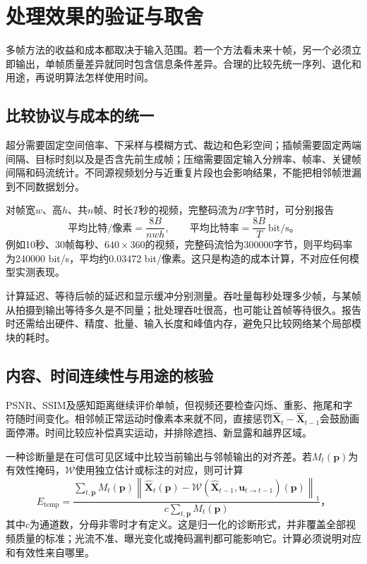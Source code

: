 \section{处理效果的验证与取舍}
\label{sec:vision-video-restoration-evaluation}

多帧方法的收益和成本都取决于输入范围。若一个方法看未来十帧，另一个必须立即输出，单帧质量差异就同时包含信息条件差异。合理的比较先统一序列、退化和用途，再说明算法怎样使用时间。

\subsection{比较协议与成本的统一}
\label{sec:vision-video-restoration-protocol}

超分需要固定空间倍率、下采样与模糊方式、裁边和色彩空间；插帧需要固定两端间隔、目标时刻以及是否含先前生成帧；压缩需要固定输入分辨率、帧率、关键帧间隔和码流统计。不同源视频划分与近重复片段也会影响结果，不能把相邻帧泄漏到不同数据划分。

对帧宽$w$、高$h$、共$n$帧、时长$T$秒的视频，完整码流为$B$字节时，可分别报告
\[
  \text{平均比特/像素}=\frac{8B}{nwh},
  \qquad
  \text{平均比特率}=\frac{8B}{T}\ \mathrm{bit/s}\text{。}
\]
例如10秒、30帧每秒、$640\times360$的视频，完整码流恰为300000字节，则平均码率为240000 bit/s，平均约0.03472 bit/像素。这只是构造的成本计算，不对应任何模型实测表现。

计算延迟、等待后帧的延迟和显示缓冲分别测量。吞吐量每秒处理多少帧，与某帧从拍摄到输出等待多久是不同量；批处理吞吐很高，也可能让首帧等待很久。报告时还需给出硬件、精度、批量、输入长度和峰值内存，避免只比较网络某个局部模块的耗时。

\subsection{内容、时间连续性与用途的核验}
\label{sec:vision-video-temporal-quality}

PSNR、SSIM及感知距离继续评价单帧，但视频还要检查闪烁、重影、拖尾和字符随时间变化。相邻帧正常运动时像素本来就不同，直接惩罚$\widehat{\bm{X}}_t-\widehat{\bm{X}}_{t-1}$会鼓励画面停滞。时间比较应补偿真实运动，并排除遮挡、新显露和越界区域。

一种诊断量是在可信可见区域中比较当前输出与邻帧输出的对齐差。若$M_t(\bm{p})$为有效性掩码，$\mathcal{W}$使用独立估计或标注的对应，则可计算
\begin{equation}
  E_{\mathrm{temp}}=
  \frac{\sum_{t,\bm{p}}M_t(\bm{p})
    \left\lVert\widehat{\bm{X}}_t(\bm{p})
      -\mathcal{W}(\widehat{\bm{X}}_{t-1},
        \bm{u}_{t\to t-1})(\bm{p})\right\rVert_1}
       {c\sum_{t,\bm{p}}M_t(\bm{p})}\text{，}
  \label{eq:vision-video-temporal-error}
\end{equation}
其中$c$为通道数，分母非零时才有定义。这是归一化的诊断形式，并非覆盖全部视频质量的标准；光流不准、曝光变化或掩码漏判都可能影响它。计算必须说明对应和有效性来自哪里。


